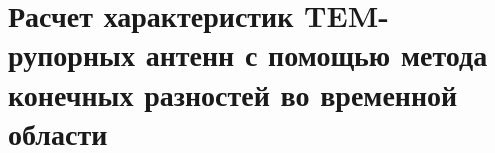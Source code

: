 

\chapter{
    Расчет характеристик TEM-рупорных антенн с помощью метода конечных разностей
    во временной области}

